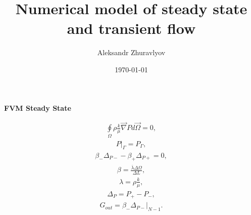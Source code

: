 \documentclass[a4paper,12pt]{extreport}
\author{Aleksandr Zhuravlyov}
\title{Numerical model of steady state and transient flow}
\date{\today}
\begin{document}
    \pagecolor{pageColor}
    \color{fontColor}

    \begin{multicols}{2}
        \begin{center}
        {\large \textbf{FVM Steady State}}
        \end{center}
        \begin{eqnarray}
            \label{eq:poisson_integral}
            \oint \limits_{\Omega} \rho \frac{k}{\mu} \vec{\nabla}P d\vec{\Omega} = 0,
        \end{eqnarray}
        \vspace{-0.5cm}
        \begin{eqnarray}
            \label{eq:poisson_integral_bound}
            P \Big|_\Gamma = P_\Gamma,
        \end{eqnarray}
        \begin{eqnarray}
            \label{eq:poisson_integral_num}
            \beta_{-}\Delta_{P-} - \beta_{+}\Delta_{P+} = 0,
        \end{eqnarray}
        \begin{eqnarray}
            \label{eq:beta}
            \beta = \frac{\overline{\lambda} \Delta \Omega}{\Delta L},
        \end{eqnarray}
        \begin{eqnarray}
            \label{eq:lambda}
            \lambda = \rho \frac{k}{\mu},
        \end{eqnarray}
        \begin{eqnarray}
            \label{eq:delta_P_num}
            \Delta_{P} = P_{+} - P_{-},
        \end{eqnarray}
        \begin{eqnarray}
            \label{eq:Consumption_poisson_integral}
            G_{out} = \beta_-\Delta_{P-} \Big|_ {N-1}.
        \end{eqnarray}


\end{multicols}
\end{document}
